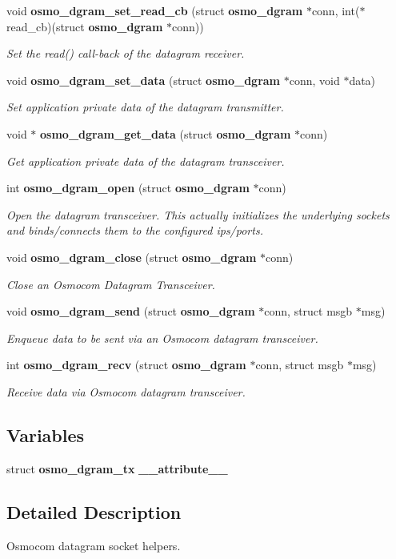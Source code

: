 \begin{DoxyCompactItemize}
void {\bf osmo\+\_\+dgram\+\_\+set\+\_\+read\+\_\+cb} (struct {\bf osmo\+\_\+dgram} $\ast$conn, int($\ast$read\+\_\+cb)(struct {\bf osmo\+\_\+dgram} $\ast$conn))
\begin{DoxyCompactList}\small\item\em Set the read() call-\/back of the datagram receiver. \end{DoxyCompactList}\item 
void {\bf osmo\+\_\+dgram\+\_\+set\+\_\+data} (struct {\bf osmo\+\_\+dgram} $\ast$conn, void $\ast$data)
\begin{DoxyCompactList}\small\item\em Set application private data of the datagram transmitter. \end{DoxyCompactList}\item 
void $\ast$ {\bf osmo\+\_\+dgram\+\_\+get\+\_\+data} (struct {\bf osmo\+\_\+dgram} $\ast$conn)
\begin{DoxyCompactList}\small\item\em Get application private data of the datagram transceiver. \end{DoxyCompactList}\item 
int {\bf osmo\+\_\+dgram\+\_\+open} (struct {\bf osmo\+\_\+dgram} $\ast$conn)
\begin{DoxyCompactList}\small\item\em Open the datagram transceiver. This actually initializes the underlying sockets and binds/connects them to the configured ips/ports. \end{DoxyCompactList}\item 
void {\bf osmo\+\_\+dgram\+\_\+close} (struct {\bf osmo\+\_\+dgram} $\ast$conn)
\begin{DoxyCompactList}\small\item\em Close an Osmocom Datagram Transceiver. \end{DoxyCompactList}\item 
void {\bf osmo\+\_\+dgram\+\_\+send} (struct {\bf osmo\+\_\+dgram} $\ast$conn, struct msgb $\ast$msg)
\begin{DoxyCompactList}\small\item\em Enqueue data to be sent via an Osmocom datagram transceiver. \end{DoxyCompactList}\item 
int {\bf osmo\+\_\+dgram\+\_\+recv} (struct {\bf osmo\+\_\+dgram} $\ast$conn, struct msgb $\ast$msg)
\begin{DoxyCompactList}\small\item\em Receive data via Osmocom datagram transceiver. \end{DoxyCompactList}\end{DoxyCompactItemize}
\subsection*{Variables}
\begin{DoxyCompactItemize}
\item 
struct {\bf osmo\+\_\+dgram\+\_\+tx} {\bfseries \+\_\+\+\_\+attribute\+\_\+\+\_\+}
\end{DoxyCompactItemize}


\subsection{Detailed Description}
Osmocom datagram socket helpers. 

